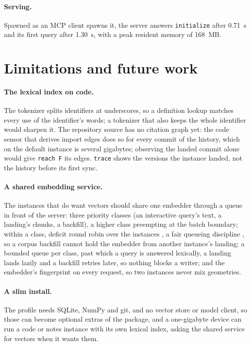 \documentclass[11pt]{article}
\theoremstyle{plain}
\theoremstyle{definition}
\theoremstyle{remark}
\newcommand{\code}[1]{\texttt{#1}}
\newcommand{\mcpinit}{0.71}
\newcommand{\mcpq}{1.30}
\newcommand{\mcprss}{168}
\begin{document}
\paragraph{Serving.} Spawned as an MCP client spawns it, the server answers \code{initialize}
after \mcpinit{}~s and its first query after \mcpq{}~s, with a peak resident memory of
\mcprss{}~MB.

\section{Limitations and future work}\label{sec:future}

\paragraph{The lexical index on code.} The tokenizer splits identifiers at underscores, so a
definition lookup matches every use of the identifier's words; a tokenizer that also keeps the
whole identifier would sharpen it. The repository source has no citation graph yet: the code
sensor that derives import edges does so for every commit of the history, which on the default
instance is several gigabytes; observing the landed commit alone would give \code{reach F} its
edges. \code{trace} shows the versions the instance landed, not the history before its first sync.

\paragraph{A shared embedding service.} The instances that do want vectors should share one
embedder through a queue in front of the server: three priority classes (an interactive query's
text, a landing's chunks, a backfill), a higher class preempting at the batch boundary; within a
class, deficit round robin over the instances \citep{shreedhar1996drr}, a fair queueing discipline
\citep{demers1989fq}, so a corpus backfill cannot hold the embedder from another instance's
landing; a bounded queue per class, past which a query is answered lexically, a landing lands
lazily and a backfill retries later, so nothing blocks a writer; and the embedder's fingerprint on
every request, so two instances never mix geometries.

\paragraph{A slim install.} The profile needs SQLite, NumPy and git, and no vector store or model
client, so those can become optional extras of the package, and a one-gigabyte device can run a
code or notes instance with its own lexical index, asking the shared service for vectors when it
wants them.
\end{document}
